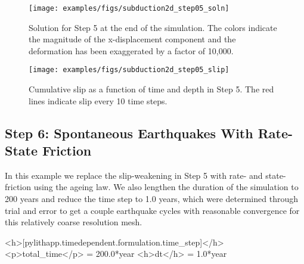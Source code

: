 \begin{figure}
  \texttt{[image: examples/figs/subduction2d\_step05\_soln]}
  \caption{Solution for Step 5 at the end of the simulation. The
    colors indicate the magnitude of the x-displacement component and
    the deformation has been exaggerated by a factor of 10,000. }
  \label{fig:example:subduction:2d:step05}
\end{figure}

\begin{figure}
  \texttt{[image: examples/figs/subduction2d\_step05\_slip]}
  \caption{Cumulative slip as a function of time and depth in Step
    5. The red lines indicate slip every 10 time steps.}
  \label{fig:example:subduction:2d:step05:slip}
\end{figure}


\subsection{Step 6: Spontaneous Earthquakes With Rate-State Friction}

In this example we replace the slip-weakening in Step 5 with rate- and
state-friction using the ageing law. We also lengthen the duration of
the simulation to 200 years and reduce the time step to 1.0 years,
which were determined through trial and error to get a couple
earthquake cycles with reasonable convergence for this relatively
coarse resolution mesh.
\begin{cfg}
<h>[pylithapp.timedependent.formulation.time_step]</h>
<p>total_time</p> = 200.0*year
<h>dt</h> = 1.0*year
\end{cfg}

